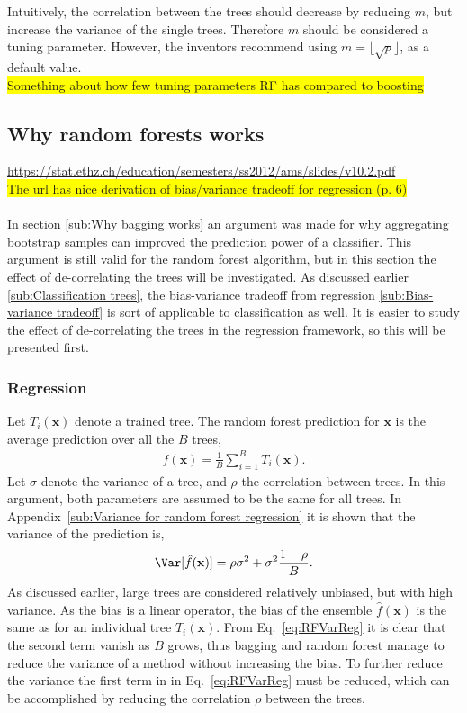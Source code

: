 Intuitively, the correlation between the trees should decrease by reducing $m$, but increase the variance of the single trees. Therefore $m$ should be considered a tuning parameter. However, the inventors recommend using $m = \lfloor \sqrt{p} \rfloor$, as a default value.
\\\colorbox{yellow}{Something about how few tuning parameters RF has compared to boosting}\\

\subsection{Why random forests works}
\label{sub:Why random forests works}
\url{https://stat.ethz.ch/education/semesters/ss2012/ams/slides/v10.2.pdf} \\
\colorbox{yellow}{The url has nice derivation of bias/variance tradeoff for regression (p. 6)}\\
\\
In section \ref{sub:Why bagging works} an argument was made for why aggregating bootstrap samples can improved the prediction power of a classifier. This argument is still valid for the random forest algorithm, but in this section the effect of de-correlating the trees will be investigated. As discussed earlier \ref{sub:Classification trees}, the bias-variance tradeoff from regression \ref{sub:Bias-variance tradeoff} is sort of applicable to classification as well. It is easier to study the effect of de-correlating  the trees in the regression framework, so this will be presented first.

\subsubsection{Regression}
\label{sub:Regression}

Let $T_i(\mathbf{x})$ denote a trained tree. The random forest prediction for $\mathbf{x}$ is the average prediction over all the $B$ trees,
\begin{align}
  \hat f(\mathbf{x}) = \frac{1}{B} \sum_{i = 1}^{B} T_i(\mathbf{x}).
\end{align}
Let $\sigma$ denote the variance of a tree, and $\rho$ the correlation between trees. In this argument, both parameters are assumed to be the same for all trees. In Appendix~\ref{sub:Variance for random forest regression} it is shown that the variance of the prediction is, 
\begin{align}
\label{eq:RFVarReg} 
  \Var[\hat f(\mathbf{x})] = \rho \sigma^2 + \sigma^2 \frac{1-\rho}{B}.
\end{align}
As discussed earlier, large trees are considered relatively unbiased, but with high variance. As the bias is a linear operator, the bias of the ensemble $\hat f(\mathbf{x})$ is the same as for an individual tree $T_i(\mathbf{x})$. From Eq.~\eqref{eq:RFVarReg} it is clear that the second term vanish as $B$ grows, thus bagging and random forest manage to reduce the variance of a method without increasing the bias. To further reduce the variance the first term in in Eq.~\eqref{eq:RFVarReg} must be reduced, which can be accomplished by reducing the correlation $\rho$ between the trees. 

